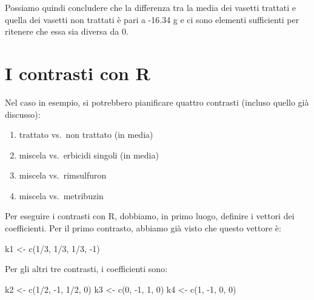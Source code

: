 \documentclass[a4paper,12pt,oneside]{book}
\providecommand{\tightlist}{%
  \setlength{\itemsep}{0pt}\setlength{\parskip}{0pt}}
\newenvironment{Shaded}{\begin{snugshade}}{\end{snugshade}}
\newcommand{\DecValTok}[1]{#1}
\newcommand{\SpecialCharTok}[1]{#1}
\newcommand{\OtherTok}[1]{#1}
\newcommand{\FunctionTok}[1]{#1}
\newcommand{\NormalTok}[1]{#1}
\begin{document}
Possiamo quindi concludere che la differenza tra la media dei vasetti trattati e quella dei vasetti non trattati è pari a -16.34 g e ci sono elementi sufficienti per ritenere che essa sia diversa da 0.

\hypertarget{i-contrasti-con-r}{%
\section{I contrasti con R}\label{i-contrasti-con-r}}

Nel caso in esempio, si potrebbero pianificare quattro contrasti (incluso quello già discusso):

\begin{enumerate}
\def\labelenumi{\arabic{enumi}.}
\tightlist
\item
  trattato vs.~non trattato (in media)
\item
  miscela vs.~erbicidi singoli (in media)
\item
  miscela vs.~rimsulfuron
\item
  miscela vs.~metribuzin
\end{enumerate}

Per eseguire i contrasti con R, dobbiamo, in primo luogo, definire i vettori dei coefficienti. Per il primo contrasto, abbiamo già visto che questo vettore è:

\begin{Shaded}
\begin{Highlighting}[]
\NormalTok{k1 }\OtherTok{\textless{}{-}} \FunctionTok{c}\NormalTok{(}\DecValTok{1}\SpecialCharTok{/}\DecValTok{3}\NormalTok{, }\DecValTok{1}\SpecialCharTok{/}\DecValTok{3}\NormalTok{, }\DecValTok{1}\SpecialCharTok{/}\DecValTok{3}\NormalTok{, }\SpecialCharTok{{-}}\DecValTok{1}\NormalTok{)}
\end{Highlighting}
\end{Shaded}

Per gli altri tre contrasti, i coefficienti sono:

\begin{Shaded}
\begin{Highlighting}[]
\NormalTok{k2 }\OtherTok{\textless{}{-}} \FunctionTok{c}\NormalTok{(}\DecValTok{1}\SpecialCharTok{/}\DecValTok{2}\NormalTok{, }\SpecialCharTok{{-}}\DecValTok{1}\NormalTok{, }\DecValTok{1}\SpecialCharTok{/}\DecValTok{2}\NormalTok{, }\DecValTok{0}\NormalTok{)}
\NormalTok{k3 }\OtherTok{\textless{}{-}} \FunctionTok{c}\NormalTok{(}\DecValTok{0}\NormalTok{, }\SpecialCharTok{{-}}\DecValTok{1}\NormalTok{, }\DecValTok{1}\NormalTok{, }\DecValTok{0}\NormalTok{)}
\NormalTok{k4 }\OtherTok{\textless{}{-}} \FunctionTok{c}\NormalTok{(}\DecValTok{1}\NormalTok{, }\SpecialCharTok{{-}}\DecValTok{1}\NormalTok{, }\DecValTok{0}\NormalTok{, }\DecValTok{0}\NormalTok{)}
\end{Highlighting}
\end{Shaded}
\end{document}
